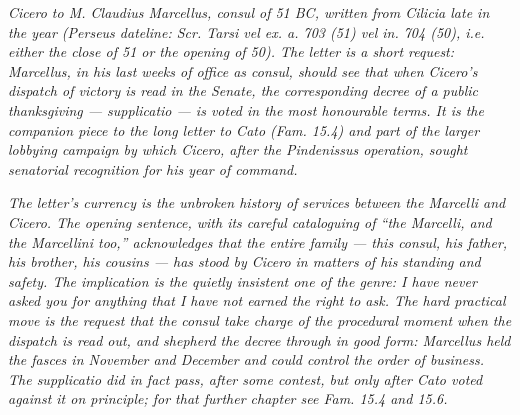 
\textit{Cicero to M. Claudius Marcellus, consul of 51
BC, written from Cilicia late in the year (Perseus
dateline: \textit{Scr. Tarsi vel ex. a. 703 (51) vel
in. 704 (50)}, i.e. either the close of 51 or the
opening of 50). The letter is a short request:
Marcellus, in his last weeks of office as consul,
should see that when Cicero's dispatch of victory is
read in the Senate, the corresponding decree of a
public thanksgiving --- \textit{supplicatio} --- is
voted in the most honourable terms. It is the
companion piece to the long letter to Cato (\textit{Fam.}
15.4) and part of the larger lobbying campaign by which
Cicero, after the Pindenissus operation, sought
senatorial recognition for his year of command.}

\textit{The letter's currency is the unbroken history
of services between the Marcelli and Cicero. The
opening sentence, with its careful cataloguing of
``the Marcelli, and the Marcellini too,'' acknowledges
that the entire family --- this consul, his father, his
brother, his cousins --- has stood by Cicero in matters
of his standing and safety. The implication is the
quietly insistent one of the genre: I have never asked
you for anything that I have not earned the right to
ask. The hard practical move is the request that the
consul take charge of the procedural moment when the
dispatch is read out, and shepherd the decree through
in good form: Marcellus held the fasces in November and
December and could control the order of business. The
\textit{supplicatio} did in fact pass, after some
contest, but only after Cato voted against it on
principle; for that further chapter see \textit{Fam.}
15.4 and 15.6.}
